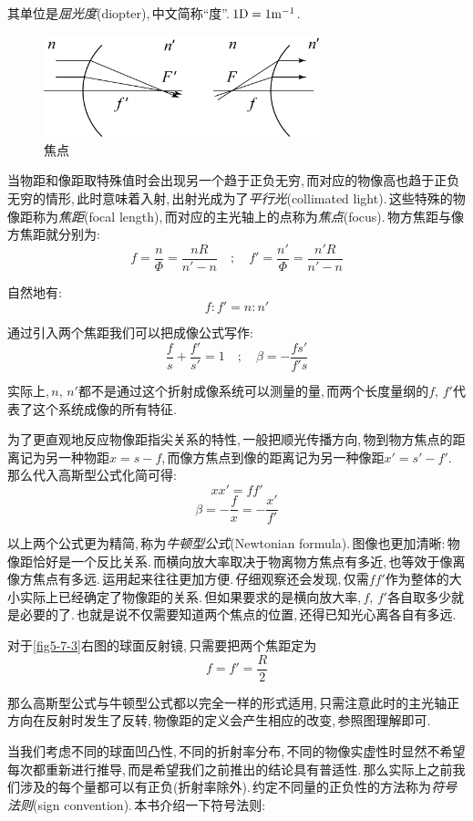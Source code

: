 其单位是\emph{屈光度}(diopter),\,中文简称``度''.\,\(1{\rm D}=1{\rm m}^{-1}\).

\begin{figure}
\centering
\vspace{0cm}
\includegraphics[width=8cm]{image/5-7-4.png}
\caption{焦点}
\end{figure}
当物距和像距取特殊值时会出现另一个趋于正负无穷,\,而对应的物像高也趋于正负无穷的情形,\,此时意味着入射,\,出射光成为了\emph{平行光}(collimated light).\,这些特殊的物像距称为\emph{焦距}(focal length),\,而对应的主光轴上的点称为\emph{焦点}(focus).\,物方焦距与像方焦距就分别为:
\[f=\frac{n}{\varPhi}=\frac{nR}{n'-n}\quad ;\quad f'=\frac{n'}{\varPhi}=\frac{n'R}{n'-n}\]

自然地有:
\[f:f'=n:n'\]

通过引入两个焦距我们可以把成像公式写作:
\[\frac{f}{s}+\frac{f'}{s'}=1\quad ;\quad \beta=-\frac{fs'}{f's}\]

实际上,\,\(n,\,n'\)都不是通过这个折射成像系统可以测量的量,\,而两个长度量纲的\(f,\,f'\)代表了这个系统成像的所有特征.

为了更直观地反应物像距指尖关系的特性,\,一般把顺光传播方向,\,物到物方焦点的距离记为另一种物距\(x=s-f\),\,而像方焦点到像的距离记为另一种像距\(x'=s'-f'\).\,那么代入高斯型公式化简可得:
\[xx'=ff'\]
\[\beta=-\frac{f}{x}=-\frac{x'}{f'}\]

以上两个公式更为精简,\,称为\emph{牛顿型公式}(Newtonian formula).\,图像也更加清晰:\,物像距恰好是一个反比关系.\,而横向放大率取决于物离物方焦点有多近,\,也等效于像离像方焦点有多远.\,运用起来往往更加方便.\,仔细观察还会发现,\,仅需\(ff'\)作为整体的大小实际上已经确定了物像距的关系.\,但如果要求的是横向放大率,\,\(f,\,f'\)各自取多少就是必要的了.\,也就是说不仅需要知道两个焦点的位置,\,还得已知光心离各自有多远.

对于\ref{fig5-7-3}右图的球面反射镜,\,只需要把两个焦距定为
\[f=f'=\frac{R}{2}\]

那么高斯型公式与牛顿型公式都以完全一样的形式适用,\,只需注意此时的主光轴正方向在反射时发生了反转,\,物像距的定义会产生相应的改变,\,参照图理解即可.

当我们考虑不同的球面凹凸性,\,不同的折射率分布,\,不同的物像实虚性时显然不希望每次都重新进行推导,\,而是希望我们之前推出的结论具有普适性.\,那么实际上之前我们涉及的每个量都可以有正负(折射率除外).\,约定不同量的正负性的方法称为\emph{符号法则}(sign convention).\,本书介绍一下符号法则:

